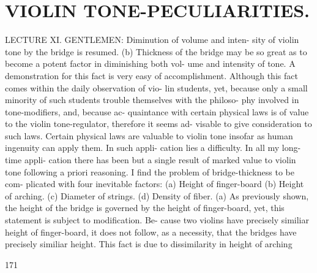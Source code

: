 \documentclass{article}
\begin{document}
\section*{VIOLIN TONE-PECULIARITIES.}
LECTURE XI. GENTLEMEN: Diminution of volume and inten- sity of violin tone by the bridge is resumed. (b) Thickness of the bridge may be so great as to become a potent factor in diminishing both vol- ume and intensity of tone. A demonstration for this fact is very easy of accomplishment. Although this fact comes within the daily observation of vio- lin students, yet, because only a small minority of such students trouble themselves with the philoso- phy involved in tone-modifiers, and, because ac- quaintance with certain physical laws is of value to the violin tone-regulator, therefore it seems ad- visable to give consideration to such laws. Certain physical laws are valuable to violin tone insofar as human ingenuity can apply them. In such appli- cation lies a difficulty. In all my long-time appli- cation there has been but a single result of marked value to violin tone following a priori reasoning. I find the problem of bridge-thickness to be com- plicated with four inevitable factors: (a) Height of finger-board (b) Height of arching. (c) Diameter of strings. (d) Density of fiber. (a) As previously shown, the height of the bridge is governed by the height of finger-board, yet, this statement is subject to modification. Be- cause two violins have precisely similiar height of finger-board, it does not follow, as a necessity, that the bridges have precisely similiar height. This fact is due to dissimilarity in height of arching

171
\end{document}
